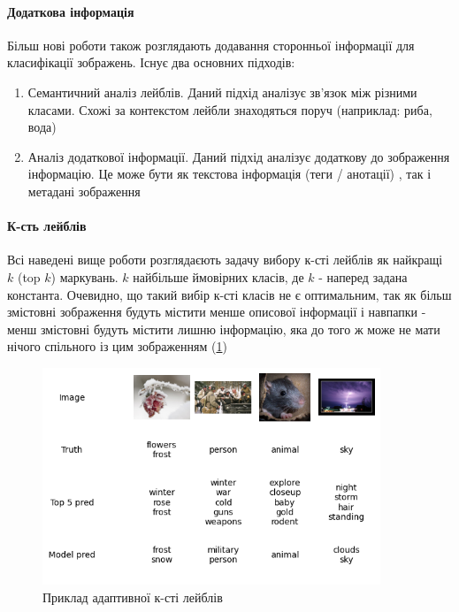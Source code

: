 \documentclass{udstu}
\begin{document}
\paragraph{\textbf{Додаткова інформація}\\}

Більш нові роботи також розглядають додавання сторонньої інформації для класифікації зображень.
Існує два основних підходів:

\begin{enumerate}
	\item Семантичний аналіз лейблів.
	Даний підхід аналізує зв'язок між різними класами.
	Схожі за контекстом лейбли знаходяться поруч (наприклад: риба, вода)
	\cite{cnn-semantic-1, cnn-semantic-2}
	\item Аналіз додаткової інформації.
	Даний підхід аналізує додаткову до зображення інформацію.
	Це може бути як текстова інформація (теги / анотації) \cite{cnn-side-2},
	так і метадані зображення \cite{cnn-side-1,cnn-side-3}
\end{enumerate}

\paragraph{\textbf{К-сть лейблів}\\}

Всі наведені вище роботи розглядаєють задачу вибору к-сті лейблів як найкращі $k$ (top $k$) маркувань.
$k$ найбільше ймовірних класів, де $k$ - наперед задана константа. Очевидно, що такий вибір к-сті класів не є
оптимальним, так як більш змістовні зображення будуть містити менше описової інформації і навпапки - менш змістовні будуть
містити лишню інформацію, яка до того ж може не мати нічого спільного із цим зображенням (\figurename{\ref{figure:test-topk}})

\begin{figure}[!ht]
	\centering
	\includegraphics[width=0.9\textwidth]{PNG/test-topk}
	\caption{Приклад адаптивної к-сті лейблів}
	\label{figure:test-topk}
\end{figure}
\end{document}
